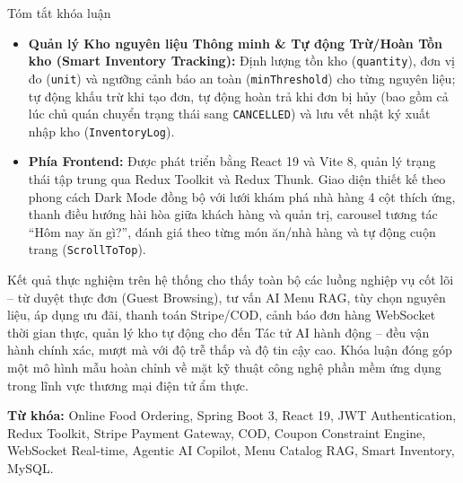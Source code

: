 \documentclass{uetgraduation}
\begin{document}
\begin{preamble}{Tóm tắt khóa luận}
\begin{itemize}
    \item \textbf{Quản lý Kho nguyên liệu Thông minh \& Tự động Trừ/Hoàn Tồn kho (Smart Inventory Tracking):} Định lượng tồn kho (\texttt{quantity}), đơn vị đo (\texttt{unit}) và ngưỡng cảnh báo an toàn (\texttt{minThreshold}) cho từng nguyên liệu; tự động khấu trừ khi tạo đơn, tự động hoàn trả khi đơn bị hủy (bao gồm cả lúc chủ quán chuyển trạng thái sang \texttt{CANCELLED}) và lưu vết nhật ký xuất nhập kho (\texttt{InventoryLog}).
    \item \textbf{Phía Frontend:} Được phát triển bằng React 19 và Vite 8, quản lý trạng thái tập trung qua Redux Toolkit và Redux Thunk. Giao diện thiết kế theo phong cách Dark Mode đồng bộ với lưới khám phá nhà hàng 4 cột thích ứng, thanh điều hướng hài hòa giữa khách hàng và quản trị, carousel tương tác ``Hôm nay ăn gì?'', đánh giá theo từng món ăn/nhà hàng và tự động cuộn trang (\texttt{ScrollToTop}).
\end{itemize}

Kết quả thực nghiệm trên hệ thống cho thấy toàn bộ các luồng nghiệp vụ cốt lõi -- từ duyệt thực đơn (Guest Browsing), tư vấn AI Menu RAG, tùy chọn nguyên liệu, áp dụng ưu đãi, thanh toán Stripe/COD, cảnh báo đơn hàng WebSocket thời gian thực, quản lý kho tự động cho đến Tác tử AI hành động -- đều vận hành chính xác, mượt mà với độ trễ thấp và độ tin cậy cao. Khóa luận đóng góp một mô hình mẫu hoàn chỉnh về mặt kỹ thuật công nghệ phần mềm ứng dụng trong lĩnh vực thương mại điện tử ẩm thực.

\vspace{0.5cm}
\textbf{Từ khóa:} Online Food Ordering, Spring Boot 3, React 19, JWT Authentication, Redux Toolkit, Stripe Payment Gateway, COD, Coupon Constraint Engine, WebSocket Real-time, Agentic AI Copilot, Menu Catalog RAG, Smart Inventory, MySQL.
\end{preamble}
\end{document}
